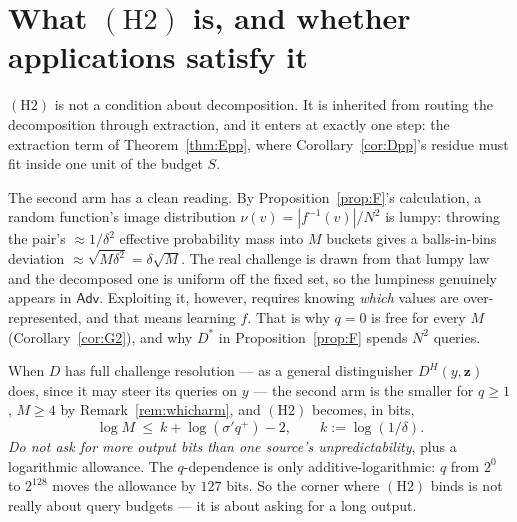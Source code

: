 \documentclass{aicr-solution}
\newcommand{\Adv}{\mathsf{Adv}}
\newcommand{\vz}{\mathbf{z}}
\begin{document}
\section{What $(\mathrm{H2})$ is, and whether applications satisfy it}\label{sec:h2}

$(\mathrm{H2})$ is not a condition about decomposition. It is inherited from routing
the decomposition through extraction, and it enters at exactly one step: the
extraction term of Theorem~\ref{thm:Epp}, where Corollary~\ref{cor:Dpp}'s residue
must fit inside one unit of the budget $S$.

The second arm has a clean reading. By Proposition~\ref{prop:F}'s calculation, a
random function's image distribution $\nu(v) = |f^{-1}(v)|/N^{2}$ is lumpy:
throwing the pair's $\approx 1/\delta^{2}$ effective probability mass into $M$
buckets gives a balls-in-bins deviation $\approx \sqrt{M\delta^{2}} = \delta\sqrt{M}$.
The real challenge is drawn from that lumpy law and the decomposed one is uniform
off the fixed set, so the lumpiness genuinely appears in $\Adv$. Exploiting it,
however, requires knowing \emph{which} values are over-represented, and that means
learning $f$. That is why $q = 0$ is free for every $M$
(Corollary~\ref{cor:G2}), and why $D^{*}$ in Proposition~\ref{prop:F} spends
$N^{2}$ queries.

When $D$ has full challenge resolution --- as a general distinguisher
$D^{H}(y,\vz)$ does, since it may steer its queries on $y$ --- the second arm is
the smaller for $q \ge 1$, $M \ge 4$ by Remark~\ref{rem:whicharm}, and
$(\mathrm{H2})$ becomes, in bits,
\[
  \log M \ \le\ k + \log(\sigma' q^{+}) - 2, \qquad k := \log(1/\delta).
\]
\emph{Do not ask for more output bits than one source's unpredictability}, plus a
logarithmic allowance. The $q$-dependence is only additive-logarithmic: $q$ from
$2^{0}$ to $2^{128}$ moves the allowance by $127$ bits. So the corner where
$(\mathrm{H2})$ binds is not really about query budgets --- it is about asking for a
long output.
\end{document}
